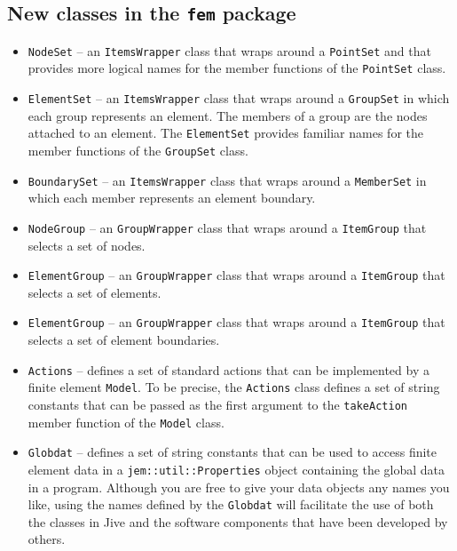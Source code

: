 \documentclass[a4paper,11pt]{article}
\newcommand{\Code}[1]{\texttt{#1}}
\begin{document}

\subsection{New classes in the \Code{fem} package}

\begin{itemize}

\item \Code{NodeSet} -- an \Code{ItemsWrapper} class that wraps around
  a \Code{PointSet} and that provides more logical names for the
  member functions of the \Code{PointSet} class.

\item \Code{ElementSet} -- an \Code{ItemsWrapper} class that wraps
  around a \Code{GroupSet} in which each group represents an element.
  The members of a group are the nodes attached to an element. The
  \Code{Element\-Set} provides familiar names for the member functions
  of the \Code{GroupSet} class.

\item \Code{BoundarySet} -- an \Code{ItemsWrapper} class that wraps
  around a \Code{Member\-Set} in which each member represents an
  element boundary.

\item \Code{NodeGroup} -- an \Code{GroupWrapper} class that wraps
  around a \Code{ItemGroup} that selects a set of nodes.

\item \Code{ElementGroup} -- an \Code{GroupWrapper} class that wraps
  around a \Code{ItemGroup} that selects a set of elements.

\item \Code{ElementGroup} -- an \Code{GroupWrapper} class that wraps
  around a \Code{ItemGroup} that selects a set of element boundaries.

\item \Code{Actions} -- defines a set of standard actions that can be
  implemented by a finite element \Code{Model}. To be precise, the
  \Code{Actions} class defines a set of string constants that can be
  passed as the first argument to the \Code{take\-Action} member
  function of the \Code{Model} class.

\item \Code{Globdat} -- defines a set of string constants that can be
  used to access finite element data in a
  \Code{jem::\-util::\-Properties} object containing the global data
  in a program. Although you are free to give your data objects any
  names you like, using the names defined by the \Code{Globdat} will
  facilitate the use of both the classes in Jive and the software
  components that have been developed by others.


\end{itemize}
\end{document}
